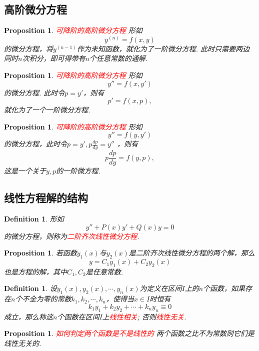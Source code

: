 \documentclass{article}
\newtheorem{proposition}[theorem]{Proposition}
\newtheorem{definition}[theorem]{Definition}
\newcommand{\redt}[1]{\textcolor{red}{#1}}
\begin{document}
\subsection{高阶微分方程}


\begin{proposition}
\rm \redt{可降阶的高阶微分方程} 形如
$$
y^{(n)}=f(x,y)
$$
的微分方程，将$y^{(n-1)}$作为未知函数，就化为了一阶微分方程. 此时只需要两边同时$n$次积分，即可得带有$n$个任意常数的通解.  
\end{proposition}

\begin{proposition}
\rm \redt{可降阶的高阶微分方程} 形如
$$
y'' = f(x,y')
$$
的微分方程. 此时令$p=y'$，则有
$$
p' = f(x,p),
$$
就化为了一个一阶微分方程. 
\end{proposition}

\begin{proposition}
\rm \redt{可降阶的高阶微分方程} 形如
$$
y'' = f(y,y')
$$
的微分方程，此时令$p = y', p \frac{dp}{dy} = y''$ ，则有
$$
p \frac{dp}{dy} = f(y,p),
$$
这是一个关于$y,p$的一阶微方程. 
\end{proposition}

\subsection{线性方程解的结构}

\begin{definition}
\rm 形如
$$
y''+P(x)y'+Q(x)y = 0
$$
的微分方程，则称为\redt{二阶齐次线性微分方程}.
\end{definition}

\begin{proposition}
\rm 若函数$y_1(x)$与$y_2(x)$是二阶齐次线性微分方程的两个解，那么
$$
y = C_1y_1(x) + C_2y_2(x)
$$
也是方程的解，其中$C_1,C_2$是任意常数. 
\end{proposition}

\begin{definition}
\rm 设$y_1(x),y_2(x),\cdots,y_n(x)$为定义在区间$I$上的$n$个函数，如果存在$n$个不全为零的常数$k_1,k_2,\cdots,k_n$，使得当$x \in I$时恒有
$$
k_1 y_1 + k_2y_2 +\cdots + k_ny_n \equiv 0
$$
成立，那么称这$n$个函数在区间$I$上\redt{线性相关}; 否则\redt{线性无关}. 
\end{definition}

\begin{proposition}
\rm \redt{如何判定两个函数是不是线性的} 两个函数之比不为常数则它们是线性无关的. 
\end{proposition}
\end{document}
